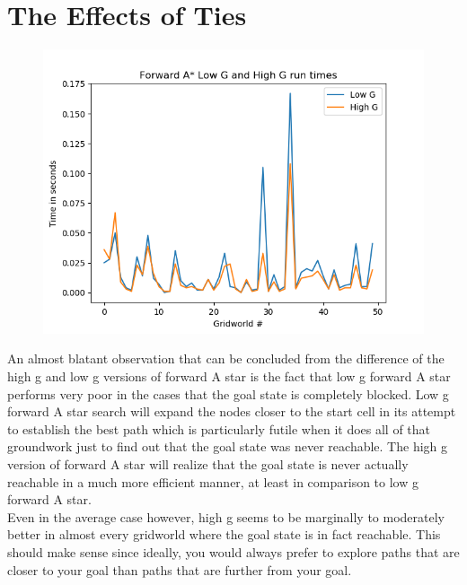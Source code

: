 \documentclass[12pt]{article}
\begin{document}
\section*{The Effects of Ties}
	\begin{figure}[!htb]
		\centering
		\includegraphics[width=.8\textwidth]{forward_low_vs_high.png}
	\end{figure}
An almost blatant observation that can be concluded from the difference of the high g and low g versions of forward A star is the fact that low g forward A star performs very poor in the cases that the goal state is completely blocked. Low g forward A star search will expand the nodes closer to the start cell in its attempt to establish the best path which is particularly futile when it does all of that groundwork just to find out that the goal state was never reachable. The high g version of forward A star will realize that the goal state is never actually reachable in a much more efficient manner, at least in comparison to low g forward A star.\\
Even in the average case however, high g seems to be marginally to moderately better in almost every gridworld where the goal state is in fact reachable. This should make sense since ideally, you would always prefer to explore paths that are closer to your goal than paths that are further from your goal.
\newpage
\end{document}
